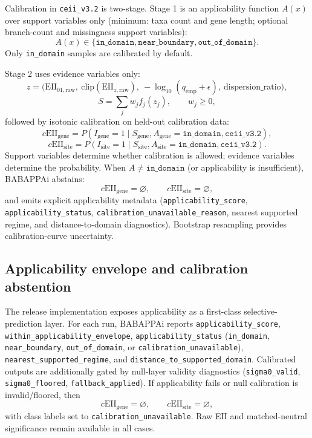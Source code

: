 \documentclass[11pt]{article}
\begin{document}
Calibration in \texttt{ceii\_v3.2} is two-stage. Stage 1 is an applicability function $A(x)$ over support variables only (minimum: taxa count and gene length; optional branch-count and missingness support variables):
\[
A(x)\in\{\texttt{in\_domain},\texttt{near\_boundary},\texttt{out\_of\_domain}\}.
\]
Only \texttt{in\_domain} samples are calibrated by default.

Stage 2 uses evidence variables only:
\[
z=\big(\mathrm{EII}_{01,\mathrm{raw}},\ \mathrm{clip}(\mathrm{EII}_{z,\mathrm{raw}}),\ -\log_{10}(q_{\mathrm{emp}}+\epsilon),\ \mathrm{dispersion\_ratio}\big),
\]
\[
S=\sum_j w_j f_j(z_j), \qquad w_j\ge 0,
\]
followed by isotonic calibration on held-out calibration data:
\[
c\mathrm{EII}_{\mathrm{gene}}=P(I_{\mathrm{gene}}=1\mid S_{\mathrm{gene}},A_{\mathrm{gene}}=\texttt{in\_domain},\texttt{ceii\_v3.2}),
\]
\[
c\mathrm{EII}_{\mathrm{site}}=P(I_{\mathrm{site}}=1\mid S_{\mathrm{site}},A_{\mathrm{site}}=\texttt{in\_domain},\texttt{ceii\_v3.2}).
\]
Support variables determine whether calibration is allowed; evidence variables determine the probability.
When $A\neq \texttt{in\_domain}$ (or applicability is insufficient), BABAPPAi abstains:
\[
c\mathrm{EII}_{\mathrm{gene}}=\varnothing,\qquad c\mathrm{EII}_{\mathrm{site}}=\varnothing,
\]
and emits explicit applicability metadata (\texttt{applicability\_score}, \texttt{applicability\_status}, \texttt{calibration\_unavailable\_reason}, nearest supported regime, and distance-to-domain diagnostics). Bootstrap resampling provides calibration-curve uncertainty.

\subsection{Applicability envelope and calibration abstention}

The release implementation exposes applicability as a first-class selective-prediction layer. For each run, BABAPPAi reports \texttt{applicability\_score}, \texttt{within\_applicability\_envelope}, \texttt{applicability\_status} (\texttt{in\_domain}, \texttt{near\_boundary}, \texttt{out\_of\_domain}, or \texttt{calibration\_unavailable}), \texttt{nearest\_supported\_regime}, and \texttt{distance\_to\_supported\_domain}. Calibrated outputs are additionally gated by null-layer validity diagnostics (\texttt{sigma0\_valid}, \texttt{sigma0\_floored}, \texttt{fallback\_applied}). If applicability fails or null calibration is invalid/floored, then
\[
c\mathrm{EII}_{\mathrm{gene}}=\varnothing,\qquad c\mathrm{EII}_{\mathrm{site}}=\varnothing,
\]
with class labels set to \texttt{calibration\_unavailable}. Raw EII and matched-neutral significance remain available in all cases.
\end{document}

